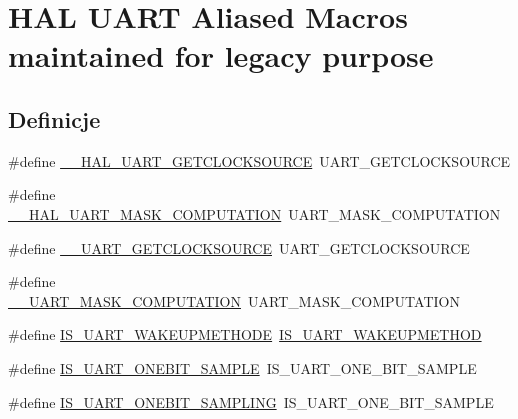\hypertarget{group___h_a_l___u_a_r_t___aliased___macros}{}\section{H\+AL U\+A\+RT Aliased Macros maintained for legacy purpose}
\label{group___h_a_l___u_a_r_t___aliased___macros}
\subsection*{Definicje}
\begin{DoxyCompactItemize}
\item 
\#define \hyperlink{group___h_a_l___u_a_r_t___aliased___macros_ga42daa2078cec8482c126dd059211feea}{\+\_\+\+\_\+\+H\+A\+L\+\_\+\+U\+A\+R\+T\+\_\+\+G\+E\+T\+C\+L\+O\+C\+K\+S\+O\+U\+R\+CE}~U\+A\+R\+T\+\_\+\+G\+E\+T\+C\+L\+O\+C\+K\+S\+O\+U\+R\+CE
\item 
\#define \hyperlink{group___h_a_l___u_a_r_t___aliased___macros_gaf30b26158e4eaa99871067016049156d}{\+\_\+\+\_\+\+H\+A\+L\+\_\+\+U\+A\+R\+T\+\_\+\+M\+A\+S\+K\+\_\+\+C\+O\+M\+P\+U\+T\+A\+T\+I\+ON}~U\+A\+R\+T\+\_\+\+M\+A\+S\+K\+\_\+\+C\+O\+M\+P\+U\+T\+A\+T\+I\+ON
\item 
\#define \hyperlink{group___h_a_l___u_a_r_t___aliased___macros_ga62b39e2261e76db74c78d6dbdb677937}{\+\_\+\+\_\+\+U\+A\+R\+T\+\_\+\+G\+E\+T\+C\+L\+O\+C\+K\+S\+O\+U\+R\+CE}~U\+A\+R\+T\+\_\+\+G\+E\+T\+C\+L\+O\+C\+K\+S\+O\+U\+R\+CE
\item 
\#define \hyperlink{group___h_a_l___u_a_r_t___aliased___macros_ga4361b9637b14e21ac5a32f8d298bd270}{\+\_\+\+\_\+\+U\+A\+R\+T\+\_\+\+M\+A\+S\+K\+\_\+\+C\+O\+M\+P\+U\+T\+A\+T\+I\+ON}~U\+A\+R\+T\+\_\+\+M\+A\+S\+K\+\_\+\+C\+O\+M\+P\+U\+T\+A\+T\+I\+ON
\item 
\#define \hyperlink{group___h_a_l___u_a_r_t___aliased___macros_gaf1bb7de79bc052cd2a1a6671c9c6687d}{I\+S\+\_\+\+U\+A\+R\+T\+\_\+\+W\+A\+K\+E\+U\+P\+M\+E\+T\+H\+O\+DE}~\hyperlink{group___u_a_r_t___private___macros_ga6fea268c66482e36fb38844b808cf695}{I\+S\+\_\+\+U\+A\+R\+T\+\_\+\+W\+A\+K\+E\+U\+P\+M\+E\+T\+H\+OD}
\item 
\#define \hyperlink{group___h_a_l___u_a_r_t___aliased___macros_ga5cc20fb4146a1269b5b8a81d5e4578fa}{I\+S\+\_\+\+U\+A\+R\+T\+\_\+\+O\+N\+E\+B\+I\+T\+\_\+\+S\+A\+M\+P\+LE}~I\+S\+\_\+\+U\+A\+R\+T\+\_\+\+O\+N\+E\+\_\+\+B\+I\+T\+\_\+\+S\+A\+M\+P\+LE
\item 
\#define \hyperlink{group___h_a_l___u_a_r_t___aliased___macros_gae24c4fef26c5d50f9c8d27f0db203a5b}{I\+S\+\_\+\+U\+A\+R\+T\+\_\+\+O\+N\+E\+B\+I\+T\+\_\+\+S\+A\+M\+P\+L\+I\+NG}~I\+S\+\_\+\+U\+A\+R\+T\+\_\+\+O\+N\+E\+\_\+\+B\+I\+T\+\_\+\+S\+A\+M\+P\+LE
\end{DoxyCompactItemize}


